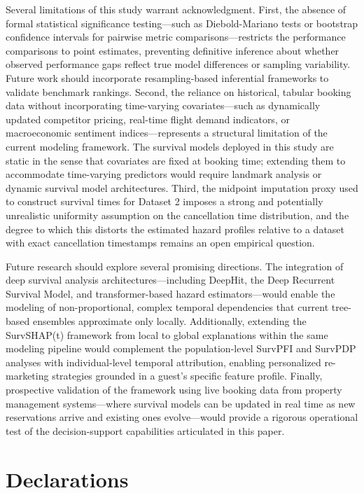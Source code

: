 \documentclass[pdflatex,sn-mathphys-ay]{sn-jnl}
\theoremstyle{thmstyleone}%
\theoremstyle{thmstyletwo}%
\theoremstyle{thmstylethree}%
\begin{document}
Several limitations of this study warrant acknowledgment. First, the absence of formal statistical significance testing—such as Diebold-Mariano tests or bootstrap confidence intervals for pairwise metric comparisons—restricts the performance comparisons to point estimates, preventing definitive inference about whether observed performance gaps reflect true model differences or sampling variability. Future work should incorporate resampling-based inferential frameworks to validate benchmark rankings. Second, the reliance on historical, tabular booking data without incorporating time-varying covariates—such as dynamically updated competitor pricing, real-time flight demand indicators, or macroeconomic sentiment indices—represents a structural limitation of the current modeling framework. The survival models deployed in this study are static in the sense that covariates are fixed at booking time; extending them to accommodate time-varying predictors would require landmark analysis or dynamic survival model architectures. Third, the midpoint imputation proxy used to construct survival times for Dataset 2 imposes a strong and potentially unrealistic uniformity assumption on the cancellation time distribution, and the degree to which this distorts the estimated hazard profiles relative to a dataset with exact cancellation timestamps remains an open empirical question.

Future research should explore several promising directions. The integration of deep survival analysis architectures—including DeepHit, the Deep Recurrent Survival Model, and transformer-based hazard estimators—would enable the modeling of non-proportional, complex temporal dependencies that current tree-based ensembles approximate only locally. Additionally, extending the SurvSHAP(t) framework \citep{krzyzinski2023survshapt} from local to global explanations within the same modeling pipeline would complement the population-level SurvPFI and SurvPDP analyses with individual-level temporal attribution, enabling personalized re-marketing strategies grounded in a guest's specific feature profile. Finally, prospective validation of the framework using live booking data from property management systems—where survival models can be updated in real time as new reservations arrive and existing ones evolve—would provide a rigorous operational test of the decision-support capabilities articulated in this paper.

\backmatter

\section*{Declarations}
\end{document}
